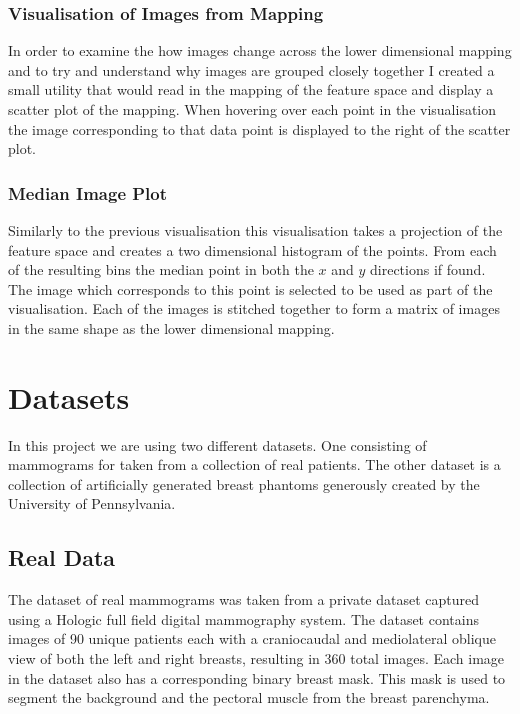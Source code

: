\subsubsection{Visualisation of Images from Mapping}
In order to examine the how images change across the lower dimensional mapping and to try and understand why images are grouped closely together I created a small utility that would read in the mapping of the feature space and display a scatter plot of the mapping. When hovering over each point in the visualisation the image corresponding to that data point is displayed to the right of the scatter plot.

\subsubsection{Median Image Plot}
Similarly to the previous visualisation this visualisation takes a projection of the feature space and creates a two dimensional histogram of the points. From each of the resulting bins the median point in both the $x$ and $y$ directions if found. The image which corresponds to this point is selected to be used as part of the visualisation. Each of the images is stitched together to form a matrix of images in the same shape as the lower dimensional mapping.

\section{Datasets}
\label{sec:datasets}
In this project we are using two different datasets. One consisting of mammograms for taken from a collection of real patients. The other dataset is a collection of artificially generated breast phantoms generously created by the University of Pennsylvania. 

\subsection{Real Data}
The dataset of real mammograms was taken from a private dataset captured using a Hologic full field digital mammography system. The dataset contains images of 90 unique patients each with a craniocaudal and mediolateral oblique view of both the left and right breasts, resulting in 360 total images. Each image in the dataset also has a corresponding binary breast mask. This mask is used to segment the  background and the pectoral muscle from the breast parenchyma.

